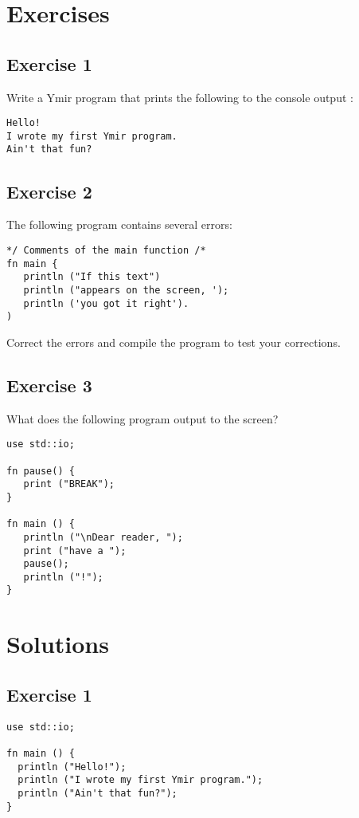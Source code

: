 \section*{Exercises}
\subsection*{Exercise 1}

Write a Ymir program that prints the following to the console output :
\begin{verbatim}
Hello!
I wrote my first Ymir program.
Ain't that fun?
\end{verbatim}

\subsection*{Exercise 2}
The following program contains several errors:

\begin{lstlisting}[style=bashVerb, caption=Ymir program with errors]
*/ Comments of the main function /*
fn main {
   println ("If this text")
   println ("appears on the screen, ');
   println ('you got it right').
)
\end{lstlisting}
Correct the errors and compile the program to test your corrections.

\subsection*{Exercise 3}

What does the following program output to the screen?
\begin{lstlisting}[style=coloredverbatim]
use std::io;

fn pause() {
   print ("BREAK");
}

fn main () {
   println ("\nDear reader, ");
   print ("have a ");
   pause();
   println ("!");
}
\end{lstlisting}

\vfill%
\pagebreak
\section*{Solutions}
\subsection*{Exercise 1}

\begin{lstlisting}[style=coloredverbatim, caption=Solution for exercise 1]
use std::io;

fn main () {
  println ("Hello!");
  println ("I wrote my first Ymir program.");
  println ("Ain't that fun?");
}
\end{lstlisting}


